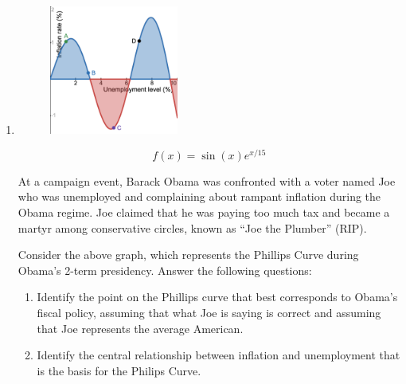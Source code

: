 \begin{enumerate}[itemsep=0.5cm]
      \item
            \begin{figure}[h]
                  \centering
                  \includegraphics[width=0.4\textwidth]{assets/phillips.png}
            \end{figure}

            \[
                  f\left(x\right)=\sin\left(x\right)e^{x/15}
            \]

            At a campaign event, Barack Obama was confronted with a voter
            named Joe who was unemployed and complaining about rampant
            inflation during the Obama regime. Joe claimed that he was
            paying too much tax and became a martyr among conservative
            circles, known as ``Joe the Plumber'' (RIP). \\
            \medskip

            Consider the above graph, which represents the Phillips Curve
            during Obama's 2-term presidency. Answer the following questions:\@

            \bigskip

            \begin{adjustwidth}{0.3in}{0.3in}
                  \begin{enumerate}[itemsep=0.5cm]

                        \item Identify the point on the Phillips curve that best
                              corresponds to Obama's fiscal policy, assuming that
                              what Joe is saying is correct and assuming that Joe
                              represents the average American.
                        \item Identify the central relationship between inflation
                              and unemployment that is the basis for the Philips Curve.


\end{enumerate}
\end{adjustwidth}
\end{enumerate}
